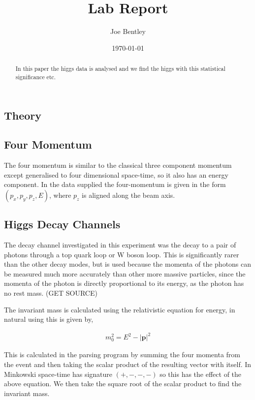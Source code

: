 \documentclass[11pt]{amsart}
\title{Lab Report}
\author{Joe Bentley}
\date{\today}
\begin{document}
\begin{abstract}
  In this paper the higgs data is analysed and we find the higgs with this statistical significance etc.
\end{abstract}

\maketitle

\newpage

\pagestyle{fancyplain}


\begin{multicols}{2}

\section{Theory}

\subsection{Four Momentum}

The four momentum is similar to the classical three component momentum except generalised to four dimensional space-time, so it also has an energy component. In the data supplied the four-momentum is given in the form $(p_x, p_y, p_z, E)$, where $p_z$ is aligned along the beam axis.

\subsection{Higgs Decay Channels}

The decay channel investigated in this experiment was the decay to a pair of photons through a top quark loop or W boson loop. This is significantly rarer than the other decay modes, but is used because the momenta of the photons can be measured much more accurately than other more massive particles, since the momenta of the photon is directly proportional to its energy, as the photon has no rest mass. (GET SOURCE)

The invariant mass is calculated using the relativistic equation for energy, in natural using this is given by,

\begin{align*}
  m_0^2 = E^2 - {|\mathbf{p}|}^2
\end{align*}

This is calculated in the parsing program by summing the four momenta from the event and then taking the scalar product of the resulting vector with itself. In Minkowski space-time has signature $(+, -, -, -)$ so this has the effect of the above equation. We then take the square root of the scalar product to find the invariant mass.


\end{multicols}
\end{document}
